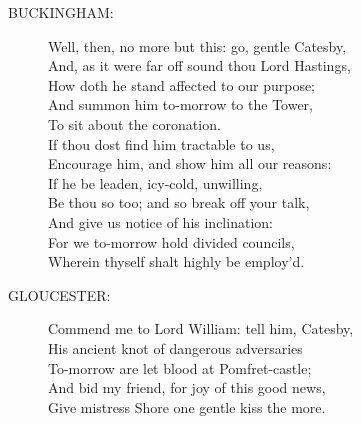 \documentclass{article}
\begin{document}
\begin{description}
\item[BUCKINGHAM:] 
\hspace{1pt}Well, then, no more but this: go, gentle Catesby,\\
\hspace{1pt}And, as it were far off sound thou Lord Hastings,\\
\hspace{1pt}How doth he stand affected to our purpose;\\
\hspace{1pt}And summon him to-morrow to the Tower,\\
\hspace{1pt}To sit about the coronation.\\
\hspace{1pt}If thou dost find him tractable to us,\\
\hspace{1pt}Encourage him, and show him all our reasons:\\
\hspace{1pt}If he be leaden, icy-cold, unwilling,\\
\hspace{1pt}Be thou so too; and so break off your talk,\\
\hspace{1pt}And give us notice of his inclination:\\
\hspace{1pt}For we to-morrow hold divided councils,\\
\hspace{1pt}Wherein thyself shalt highly be employ'd.\\
\end{description}
\begin{description}
\item[GLOUCESTER:] 
\hspace{1pt}Commend me to Lord William: tell him, Catesby,\\
\hspace{1pt}His ancient knot of dangerous adversaries\\
\hspace{1pt}To-morrow are let blood at Pomfret-castle;\\
\hspace{1pt}And bid my friend, for joy of this good news,\\
\hspace{1pt}Give mistress Shore one gentle kiss the more.\\
\end{description}
\end{document}
